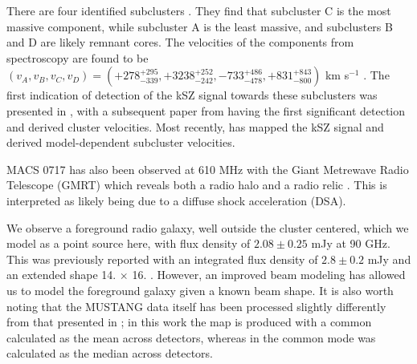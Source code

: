 \documentclass[iop,numberedappendix,apj]{emulateapj}
\begin{document}
There are four identified subclusters \citep[labeled A through D][]{ma2009}. They find that subcluster C is the
most massive component, while subcluster A is the least massive, and subclusters B and D are likely remnant cores. The
velocities of the components from spectroscopy are found to be $(v_A, v_B, v_C, v_D) = (+278_{-339}^{+295},+3238_{-242}^{+252},
-733_{-478}^{+486},+831_{-800}^{+843})$ km s$^{-1}$ \citep{ma2009}. The first indication of detection of the kSZ signal
towards these subclusters was presented in \citet{mroczkowski2012}, with a subsequent paper from \citet{sayers2013}
having the first significant detection and derived cluster velocities. Most recently, \citet{adam2016b} has mapped the 
kSZ signal and derived model-dependent subcluster velocities. 

MACS 0717 has also been observed at 610 MHz with the Giant Metrewave Radio Telescope (GMRT) which reveals both a radio
halo and a radio relic \citep{vanweeren2009}. This is interpreted as likely being due to a diffuse shock acceleration
(DSA).

We observe a foreground radio galaxy, well outside the cluster centered, which we model as a point source here, 
with flux density of $2.08 \pm 0.25$ mJy at 90 GHz. 
This was previously reported with an integrated flux density of $2.8 \pm 0.2$ mJy and an extended shape 
14. $\times$ 16. \citep{mroczkowski2012}. However, an improved beam modeling has allowed us to model the 
foreground galaxy given a known beam shape. It is also worth noting that the MUSTANG data itself has been processed 
slightly differently from that presented in \citet{mroczkowski2012}; in this work the map is produced with a common 
calculated as the mean across detectors, whereas in \citet{mroczkowski2012} the common mode was calculated as the 
median across detectors.


\end{document}
